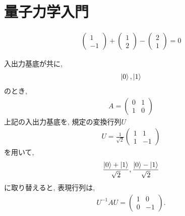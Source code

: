 \chapter{量子力学入門}


\begin{ex}
    \label{ex2.1}
    \begin{align*}
        \begin{pmatrix}
            1 \\ -1
        \end{pmatrix}
        +
        \begin{pmatrix}
            1 \\ 2
        \end{pmatrix}
        -
        \begin{pmatrix}
            2 \\ 1
        \end{pmatrix}
        =
        0
    \end{align*}
\end{ex}

\begin{ex}
    \label{ex2.2}
    入出力基底が共に,
    \begin{align*}
        \ket{0},\ket{1}
    \end{align*}
    のとき,
    \begin{align*}
        A
        =
        \begin{pmatrix}
            0 & 1 \\
            1 & 0
        \end{pmatrix}
    \end{align*}
    上記の入出力基底を, 規定の変換行列$U$
    \begin{align*}
        U
        =
        \frac{1}{\sqrt{2}}
        \begin{pmatrix}
            1 & 1  \\
            1 & -1
        \end{pmatrix}
    \end{align*}
    を用いて,
    \begin{align*}
        \frac{\ket{0}+\ket{1}}{\sqrt{2}},\frac{\ket{0}-\ket{1}}{\sqrt{2}}
    \end{align*}
    に取り替えると, 表現行列は,
    \begin{align*}
        U^{-1}AU
        =
        \begin{pmatrix}
            1 & 0  \\
            0 & -1
        \end{pmatrix}.
    \end{align*}
\end{ex}

